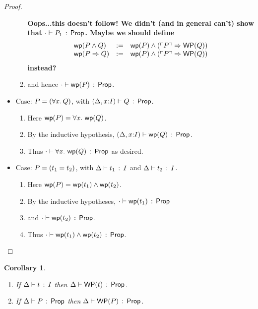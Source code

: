 \documentclass[10pt,letter]{article}
\newtheorem{corollary}[theorem]{Corollary}
\begin{document}
\begin{proof}
\begin{itemize}
\begin{enumerate}
         {\bf Oops...this doesn't follow!  We didn't (and in
           general can't) show that $\cdot \vdash P_1\, :\, \mathsf{Prop}$.
         Maybe we should define 
\[
\begin{array}{lll}
\mathop{\mathsf{wp}}(P \wedge Q) &:=& \mathop{\mathsf{wp}}(P) \wedge (\ulcorner P \urcorner \Rightarrow \mathop{\mathsf{WP}}(Q))\\
\mathop{\mathsf{wp}}(P \Rightarrow Q) &:=& \mathop{\mathsf{wp}}(P) \wedge (\ulcorner P \urcorner \Rightarrow \mathop{\mathsf{WP}}(Q))\\
\end{array}
\]
instead?
}
         
       \item
         and hence $\cdot \vdash \mathop{\mathsf{wp}}(P)\, :\, \mathsf{Prop}$.
       \end{enumerate}
  \item Case: $P=(\forall x.\, Q)$, 
        with $(\Delta,x{:}I) \vdash Q\, :\, \mathsf{Prop}$.
  	\begin{enumerate}
	\item 
		Here $\mathop{\mathsf{wp}}(P) = \forall x.\, \mathop{\mathsf{wp}}(Q)$.
	\item 
		By the inductive hypothesis,
	   $(\Delta,x{:}I) \vdash \mathop{\mathsf{wp}}(Q)\, :\, \mathsf{Prop}$.
	\item 
		Thus
	   $\cdot \vdash \forall x.\, \mathop{\mathsf{wp}}(Q)\, :\, \mathsf{Prop}$ as desired.
	\end{enumerate}
  \item Case: $P = (t_1 = t_2)$, with $\Delta \vdash t_1\, :\, I$ and $\Delta \vdash t_2\, :\, I$. 
    	\begin{enumerate}
	\item 
		Here $\mathop{\mathsf{wp}}(P) = \mathop{\mathsf{wp}}(t_1) \wedge \mathop{\mathsf{wp}}(t_2)$.
	\item 
		By the inductive hypotheses,
		$\cdot \vdash \mathop{\mathsf{wp}}(t_1)\, :\, \mathsf{Prop}$ 
	\item 
		and $\cdot \vdash \mathop{\mathsf{wp}}(t_2)\, :\, \mathsf{Prop}$.
	\item
		Thus $\cdot \vdash \mathop{\mathsf{wp}}(t_1) \wedge \mathop{\mathsf{wp}}(t_2)\, :\, \mathsf{Prop}$.
	\end{enumerate}
  \end{itemize}
\end{proof}

\begin{corollary}
\mbox{}
\begin{enumerate}
\item If $\Delta \vdash t\, :\, I$ then
  $\Delta \vdash \mathop{\mathsf{WP}}(t)\, :\, \mathsf{Prop}$.
\item If $\Delta \vdash P\, :\, \mathsf{Prop}$ then
  $\Delta \vdash \mathop{\mathsf{WP}}(P)\, :\, \mathsf{Prop}$.
\end{enumerate}
\end{corollary}
\end{document}
